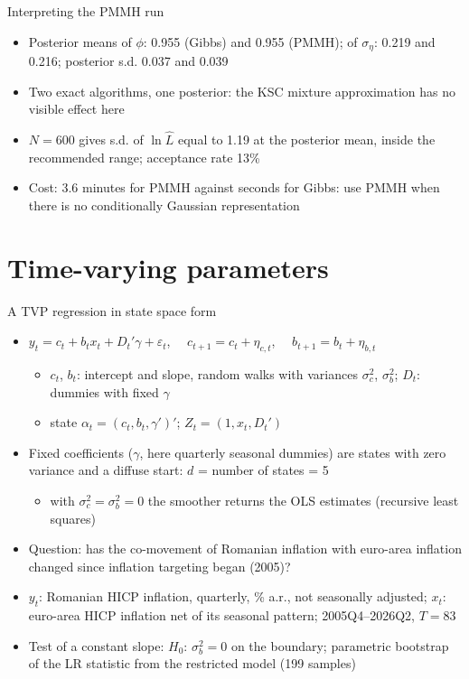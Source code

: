 \begin{frame}{Interpreting the PMMH run}
\itemsize{\small}
\begin{itemize}
    \item Posterior means of $\phi$: 0.955 (Gibbs) and 0.955 (PMMH); of $\sigma_\eta$: 0.219 and 0.216; posterior s.d. 0.037 and 0.039
    \item Two exact algorithms, one posterior: the KSC mixture approximation has no visible effect here
    \item $N = 600$ gives s.d. of $\ln\hat L$ equal to 1.19 at the posterior mean, inside the recommended range; acceptance rate 13\%
    \item Cost: 3.6 minutes for PMMH against seconds for Gibbs: use PMMH when there is no conditionally Gaussian representation
\end{itemize}
\end{frame}


\section{Time-varying parameters}

\begin{frame}{A TVP regression in state space form}
\itemsize{\small}
\begin{itemize}
    \item $y_t = c_t + b_tx_t + D_t'\gamma + \varepsilon_t$, $\quad c_{t+1} = c_t + \eta_{c,t}$, $\quad b_{t+1} = b_t + \eta_{b,t}$
    \begin{itemize}
        \item $c_t$, $b_t$: intercept and slope, random walks with variances $\sigma^2_c$, $\sigma^2_b$; $D_t$: dummies with fixed $\gamma$
        \item state $\alpha_t = (c_t, b_t, \gamma')'$; $Z_t = (1, x_t, D_t')$
    \end{itemize}
    \item Fixed coefficients ($\gamma$, here quarterly seasonal dummies) are states with zero variance and a diffuse start: $d$ = number of states = 5
    \begin{itemize}
        \item with $\sigma^2_c = \sigma^2_b = 0$ the smoother returns the OLS estimates (recursive least squares)
    \end{itemize}
    \item Question: has the co-movement of Romanian inflation with euro-area inflation changed since inflation targeting began (2005)?
    \item $y_t$: Romanian HICP inflation, quarterly, \% a.r., not seasonally adjusted; $x_t$: euro-area HICP inflation net of its seasonal pattern; 2005Q4--2026Q2, $T = 83$
    \item Test of a constant slope: $H_0$: $\sigma^2_b = 0$ on the boundary; parametric bootstrap of the LR statistic from the restricted model (199 samples)
\end{itemize}
\end{frame}

